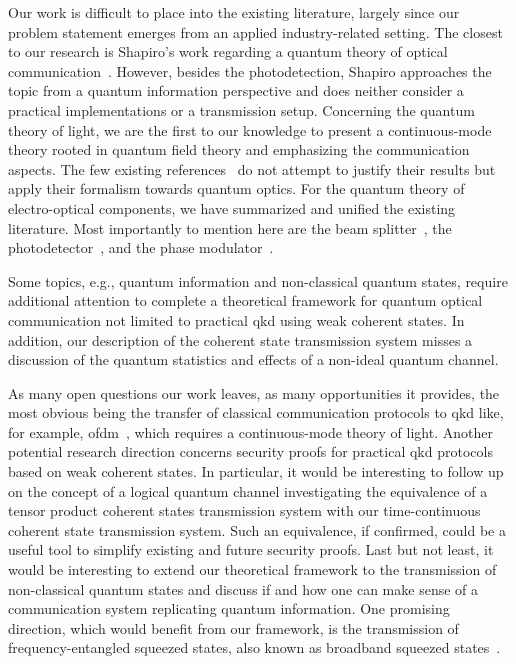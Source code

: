 Our work is difficult to place into the existing literature, largely since our problem statement emerges from an applied industry-related setting.
The closest to our research is Shapiro's work regarding a quantum theory of optical communication~\cite{Shapiro2009}.
However, besides the photodetection, Shapiro approaches the topic from a quantum information perspective and does neither consider a practical implementations or a transmission setup.
Concerning the quantum theory of light, we are the first to our knowledge to present a continuous-mode theory rooted in quantum field theory and emphasizing the communication aspects.
The few existing references~\cite{Barnett2002,Loudon2000} do not attempt to justify their results but apply their formalism towards quantum optics.
For the quantum theory of electro-optical components, we have summarized and unified the existing literature.
Most importantly to mention here are the beam splitter~\cite{Haroche2006,Leonhardt2003,Vogel2006}, the photodetector~\cite{Vogel2006,Mandel1995,Shapiro2009}, and the phase modulator~\cite{Horoshko2018,QuesadaMejia2015}.

Some topics, e.g., quantum information and non-classical quantum states, require additional attention to complete a theoretical framework for quantum optical communication not limited to practical \gls{qkd} using weak coherent states.
In addition, our description of the coherent state transmission system misses a discussion of the quantum statistics and effects of a non-ideal quantum channel.

As many open questions our work leaves, as many opportunities it provides, the most obvious being the transfer of classical communication protocols to \gls{qkd} like, for example, \gls{ofdm}~\cite{Bahrani2015}, which requires a continuous-mode theory of light.
Another potential research direction concerns security proofs for practical \gls{qkd} protocols based on weak coherent states.
In particular, it would be interesting to follow up on the concept of a logical quantum channel investigating the equivalence of a tensor product coherent states transmission system with our time-continuous coherent state transmission system.
Such an equivalence, if confirmed, could be a useful tool to simplify existing and future security proofs.
Last but not least, it would be interesting to extend our theoretical framework to the transmission of non-classical quantum states and discuss if and how one can make sense of a communication system replicating quantum information.
One promising direction, which would benefit from our framework, is the transmission of frequency-entangled squeezed states, also known as broadband squeezed states~\cite{Vogel2006,Mandel1995}.